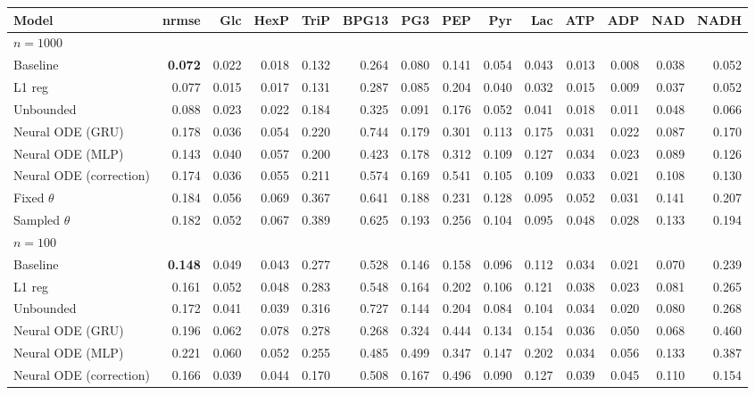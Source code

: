 \begin{tabular}{lrrrrrrrrrrrrr}
\toprule
Model & nrmse & Glc & HexP & TriP & BPG13 & PG3 & PEP & Pyr & Lac & ATP & ADP & NAD & NADH \\
\midrule
\multicolumn{14}{l}{\textbf{$n=1000$}} \\
Baseline & \textbf{0.072} & 0.022 & 0.018 & 0.132 & 0.264 & 0.080 & 0.141 & 0.054 & 0.043 & 0.013 & 0.008 & 0.038 & 0.052 \\
L1 reg & 0.077 & 0.015 & 0.017 & 0.131 & 0.287 & 0.085 & 0.204 & 0.040 & 0.032 & 0.015 & 0.009 & 0.037 & 0.052 \\
Unbounded & 0.088 & 0.023 & 0.022 & 0.184 & 0.325 & 0.091 & 0.176 & 0.052 & 0.041 & 0.018 & 0.011 & 0.048 & 0.066 \\
Neural ODE (GRU) & 0.178 & 0.036 & 0.054 & 0.220 & 0.744 & 0.179 & 0.301 & 0.113 & 0.175 & 0.031 & 0.022 & 0.087 & 0.170 \\
Neural ODE (MLP) & 0.143 & 0.040 & 0.057 & 0.200 & 0.423 & 0.178 & 0.312 & 0.109 & 0.127 & 0.034 & 0.023 & 0.089 & 0.126 \\
Neural ODE (correction) & 0.174 & 0.036 & 0.055 & 0.211 & 0.574 & 0.169 & 0.541 & 0.105 & 0.109 & 0.033 & 0.021 & 0.108 & 0.130 \\
Fixed $\theta$ & 0.184 & 0.056 & 0.069 & 0.367 & 0.641 & 0.188 & 0.231 & 0.128 & 0.095 & 0.052 & 0.031 & 0.141 & 0.207 \\
Sampled $\theta$ & 0.182 & 0.052 & 0.067 & 0.389 & 0.625 & 0.193 & 0.256 & 0.104 & 0.095 & 0.048 & 0.028 & 0.133 & 0.194 \\
\midrule
\multicolumn{14}{l}{\textbf{$n=100$}} \\
Baseline & \textbf{0.148} & 0.049 & 0.043 & 0.277 & 0.528 & 0.146 & 0.158 & 0.096 & 0.112 & 0.034 & 0.021 & 0.070 & 0.239 \\
L1 reg & 0.161 & 0.052 & 0.048 & 0.283 & 0.548 & 0.164 & 0.202 & 0.106 & 0.121 & 0.038 & 0.023 & 0.081 & 0.265 \\
Unbounded & 0.172 & 0.041 & 0.039 & 0.316 & 0.727 & 0.144 & 0.204 & 0.084 & 0.104 & 0.034 & 0.020 & 0.080 & 0.268 \\
Neural ODE (GRU) & 0.196 & 0.062 & 0.078 & 0.278 & 0.268 & 0.324 & 0.444 & 0.134 & 0.154 & 0.036 & 0.050 & 0.068 & 0.460 \\
Neural ODE (MLP) & 0.221 & 0.060 & 0.052 & 0.255 & 0.485 & 0.499 & 0.347 & 0.147 & 0.202 & 0.034 & 0.056 & 0.133 & 0.387 \\
Neural ODE (correction) & 0.166 & 0.039 & 0.044 & 0.170 & 0.508 & 0.167 & 0.496 & 0.090 & 0.127 & 0.039 & 0.045 & 0.110 & 0.154 \\

\end{tabular}
